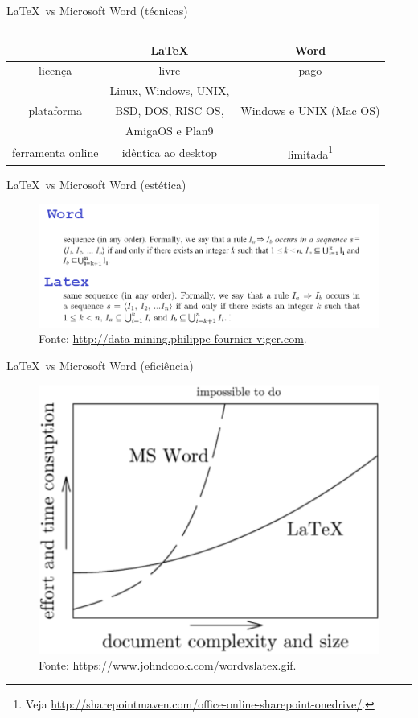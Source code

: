 \documentclass[c]{beamer}
\newcommand{\source}[1]{
\caption*{Fonte: {#1}} 
}
\begin{document}
{\begin{frame}{\sc \LaTeX \ vs Microsoft Word (técnicas)}
	\begin{table}
		\centering
		\begin{tabular}{c|c|c} 
			\toprule
			     & \LaTeX 		& Word \\
			\midrule
			licença	       & livre		& pago\\ \hline
			\multirow{3}{*}{plataforma}	   &\multirow{1}{*}{ Linux, Windows, UNIX, } &\multirow{3}{*}{ Windows e UNIX (Mac OS)} \\ 
			&\multirow{1}{*}{ BSD, DOS, RISC OS,} &  \\ 
			&\multirow{1}{*}{ AmigaOS e Plan9} &  \\ \hline
			ferramenta online & idêntica ao desktop & limitada\footnote{Veja \url{http://sharepointmaven.com/office-online-sharepoint-onedrive/}.}  \\ \hline
			\bottomrule
		\end{tabular}
		\caption{}
		\label{a_b_values_tab}
	\end{table}

\end{frame}

\begin{frame}{\sc \LaTeX \ vs Microsoft Word (estética)}
\begin{figure}[b!]
	\centering
	\includegraphics[width=0.99\linewidth]{images/word_vs_latex.png}
	\caption{Fonte: \url{http://data-mining.philippe-fournier-viger.com}.}
	\label{latex_vs_word}
\end{figure}
\end{frame}

\begin{frame}{\sc \LaTeX \ vs Microsoft Word (eficiência)}
	\begin{figure}[b!]
		\centering
		\includegraphics[width=0.59\linewidth]{images/wordvslatex.pdf}
		\caption{Fonte: \url{https://www.johndcook.com/wordvslatex.gif}.}
		\label{latex_vs_word2}
	\end{figure}
\end{frame}

}
\end{document}
